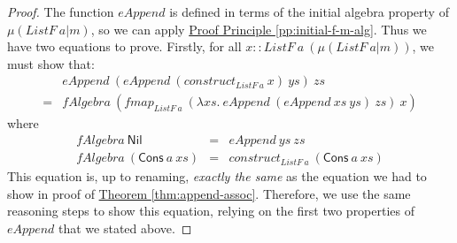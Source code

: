 \documentclass{jfp1}
\newcommand{\proofprinref}[1]{\hyperref[#1]{Proof Principle \ref*{#1}}}
\newcommand{\thmref}[1]{\hyperref[#1]{Theorem \ref*{#1}}}
\begin{document}
\begin{proof}
  The function $\mathit{eAppend}$ is defined in terms of the initial
  algebra property of $\mu(\mathit{ListF}~a|m)$, so we can apply
  \proofprinref{pp:initial-f-m-alg}. Thus we have two equations to
  prove. Firstly, for all $x ::
  \mathit{ListF}~a~(\mu(\mathit{ListF}~a|m))$, we must show that:
  \begin{displaymath}
    \begin{array}{cl}
      &\mathit{eAppend}~(\mathit{eAppend}~(\mathit{construct}_{\mathit{ListF}~a}~x)~\mathit{ys})~\mathit{zs}\\
      =&\mathit{fAlgebra}~(\mathit{fmap}_{\mathit{ListF}~a}~(\lambda \mathit{xs}.~\mathit{eAppend}~(\mathit{eAppend}~\mathit{xs}~\mathit{ys})~\mathit{zs})~x)
    \end{array}
  \end{displaymath}
  where
  \begin{displaymath}
    \begin{array}{rcl}
      \mathit{fAlgebra}~\mathsf{Nil} &=& \mathit{eAppend}~\mathit{ys}~\mathit{zs} \\
      \mathit{fAlgebra}~(\mathsf{Cons}~a~\mathit{xs}) &=& \mathit{construct}_{\mathit{ListF}~a}~(\mathsf{Cons}~a~\mathit{xs})
    \end{array}
  \end{displaymath}
  This equation is, up to renaming, \emph{exactly the same} as the
  equation we had to show in proof of
  \thmref{thm:append-assoc}. Therefore, we use the same reasoning
  steps to show this equation, relying on the first two properties of
  $\mathit{eAppend}$ that we stated above.


\end{proof}
\end{document}
